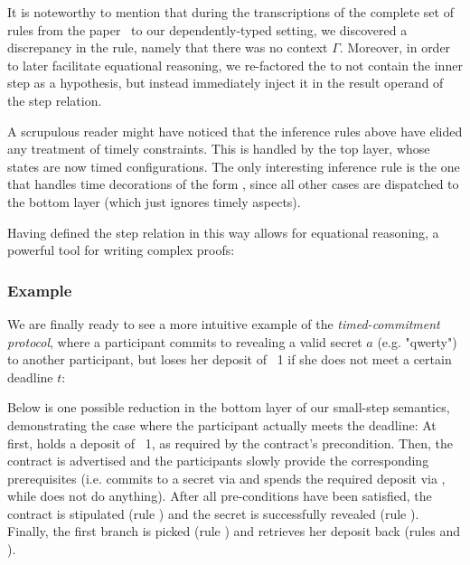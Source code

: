 \documentclass[acmsmall,nonacm=true,screen=true]{acmart}
\begin{document}
It is noteworthy to mention that during the transcriptions of the complete set of rules from the paper~\cite{bitml}
to our dependently-typed setting,
we discovered a discrepancy in the \inlineAuthRevRule{} rule, namely that there was no context $\Gamma$.
Moreover, in order to later facilitate equational reasoning, we re-factored the \inlineControlRule{}
to not contain the inner step as a hypothesis, but instead immediately inject it in the result operand of the step relation.

A scrupulous reader might have noticed that the inference rules above have elided any treatment of timely constraints.
This is handled by the top layer, whose states are now timed configurations.
The only interesting inference rule is the one that handles time decorations of the form \inlineAfter{},
since all other cases are dispatched to the bottom layer (which just ignores timely aspects).
\BITtimedRules{}

Having defined the step relation in this way allows for equational reasoning, a powerful tool for
writing complex proofs:
\BITeqReasoning{}

\subsubsection{Example}
We are finally ready to see a more intuitive example of the \textit{timed-commitment protocol}, where a participant
commits to revealing a valid secret $a$ (e.g. "qwerty") to another participant,
but loses her deposit of \bitcoin ~1 if she does not meet a certain deadline $t$:
\BITexampleA{}

Below is one possible reduction in the bottom layer of our small-step semantics, demonstrating the case where
the participant actually meets the deadline:
\BITexampleB{}
At first, \inlineA{} holds a deposit of \bitcoin ~1, as required by the contract's precondition.
Then, the contract is advertised and the participants slowly provide the corresponding prerequisites
(i.e. \inlineA{} commits to a secret via \inlineAuthCommitRule{} and spends the required deposit via \inlineAuthInitRule{},
while \inlineB{} does not do anything).
After all pre-conditions have been satisfied, the contract is stipulated (rule \inlineInitRule{}) and the secret is successfully
revealed (rule \inlineAuthRevRule{}).
Finally, the first branch is picked (rule \inlineControlRule{}) and \inlineA{} retrieves her deposit back
(rules \inlinePutRevRule{} and \inlineWithdrawRule{}).
\end{document}
